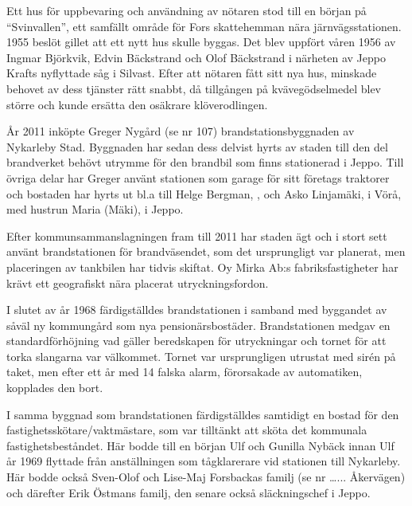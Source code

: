 Ett hus för uppbevaring och användning av nötaren stod till en början på ``Svinvallen'', ett samfällt område för Fors skattehemman nära järnvägsstationen. 1955 beslöt gillet att ett nytt hus skulle byggas. Det blev uppfört våren 1956 av Ingmar Björkvik, Edvin  Bäckstrand och Olof Bäckstrand i närheten av Jeppo Krafts nyflyttade såg i Silvast. Efter att nötaren fått sitt nya hus, minskade behovet av dess tjänster rätt snabbt, då tillgången på kvävegödselmedel blev större och kunde ersätta den osäkrare klöverodlingen.




År 2011 inköpte Greger Nygård (se nr 107) brandstationsbyggnaden av Nykarleby Stad. Byggnaden har sedan dess delvist hyrts av staden
till den del brandverket behövt utrymme för den brandbil som finns stationerad i Jeppo. Till övriga delar har Greger använt stationen som
garage för sitt företags traktorer och bostaden har hyrts ut bl.a till Helge Bergman, , och Asko Linjamäki,  i Vörå, med hustrun Maria (Mäki),  i Jeppo.


Efter kommunsammanslagningen fram till 2011 har staden ägt och i stort sett använt brandstationen för brandväsendet, som det ursprungligt var planerat, men placeringen av tankbilen har tidvis skiftat. Oy Mirka Ab:s fabriksfastigheter har krävt ett geografiskt nära placerat utryckningsfordon.


I slutet av år 1968 färdigställdes brandstationen i samband med byggandet av såväl ny kommungård som nya pensionärsbostäder. Brandstationen medgav en standardförhöjning vad gäller beredskapen för utryckningar och tornet för att torka slangarna var välkommet. Tornet var ursprungligen utrustat med sirén på taket, men efter ett år med 14 falska alarm, förorsakade av automatiken, kopplades den bort.

I samma byggnad som brandstationen färdigställdes samtidigt en bostad för den fastighetsskötare/vaktmästare, som var tilltänkt att sköta det kommunala fastighetsbeståndet. Här bodde till en början Ulf och Gunilla Nybäck innan Ulf år 1969 flyttade från anställningen som tågklarerare vid stationen till Nykarleby. Här bodde också Sven-Olof och Lise-Maj Forsbackas familj (se nr …... Åkervägen) och därefter Erik Östmans familj, den senare också släckningschef i Jeppo.



